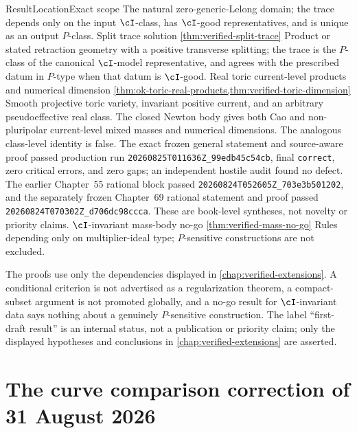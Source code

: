 \begin{AppLProvenanceLedger}{Result}{Location}{Exact scope}
  {The natural zero-generic-Lelong domain; the trace depends only on the
   input \(\cI\)-class, has \(\cI\)-good representatives, and is unique as
   an output \(P\)-class.}
\AppLProvenanceRecord
  {Split trace solution}
  {\cref{thm:verified-split-trace}}
  {Product or stated retraction geometry with a positive transverse
   splitting; the trace is the \(P\)-class of the canonical
   \(\cI\)-model representative, and agrees with the prescribed datum in
   \(P\)-type when that datum is \(\cI\)-good.}
\AppLProvenanceRecord
  {Real toric current-level products and numerical dimension}
  {\cref{thm:ok-toric-real-products,thm:verified-toric-dimension}}
  {Smooth projective toric variety, invariant positive current, and an
   arbitrary pseudoeffective real class.  The closed Newton body gives both
   Cao and non-pluripolar current-level mixed masses and numerical
   dimensions.  The analogous class-level identity is false.  The exact
   frozen general statement and source-aware proof passed production run
   \nolinkurl{20260825T011636Z_99edb45c54cb}, final \texttt{correct}, zero
   critical errors, and zero gaps; an independent hostile audit found no
   defect.  The earlier Chapter~55 rational block passed
   \nolinkurl{20260824T052605Z_703e3b501202}, and the separately frozen
   Chapter~69 rational statement and proof passed
   \nolinkurl{20260824T070302Z_d706dc98ccca}.  These are book-level
   syntheses, not novelty or priority claims.}
\AppLProvenanceRecord
  {\(\cI\)-invariant mass-body no-go}
  {\cref{thm:verified-mass-no-go}}
  {Rules depending only on multiplier-ideal type; \(P\)-sensitive
   constructions are not excluded.}
\end{AppLProvenanceLedger}

The proofs use only the dependencies displayed in
\cref{chap:verified-extensions}.  A conditional
criterion is not advertised as a regularization theorem, a compact-subset
argument is not promoted globally, and a no-go result for \(\cI\)-invariant
data says nothing about a genuinely \(P\)-sensitive construction.
The label ``first-draft result'' is an internal status, not a publication or
priority claim; only the displayed hypotheses and conclusions in
\cref{chap:verified-extensions}
are asserted.

\section{The curve comparison correction of 31 August 2026}
\label{sec:appL-curve-correction-20260831}

